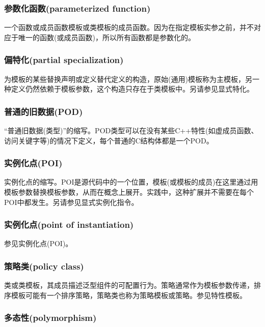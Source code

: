 \subsubsection{参数化函数(parameterized function)}

一个函数或成员函数模板或类模板的成员函数。因为在指定模板实参之前，并不对应于唯一的函数(或成员函数)，所以所有函数都是参数化的。

\subsubsection{偏特化(partial specialization)}

为模板的某些替换声明或定义替代定义的构造，原始(通用)模板称为主模板，另一种定义仍然依赖于模板参数，这个构造只存在于类模板中。另请参见显式特化。

\subsubsection{普通的旧数据(POD)}

“普通旧数据(类型)”的缩写。POD类型可以在没有某些C++特性(如虚成员函数、访问关键字等)的情况下定义，每个普通的C结构体都是一个POD。

\subsubsection{实例化点(POI)}

实例化点的缩写。POI是源代码中的一个位置，模板(或模板的成员)在这里通过用模板参数替换模板参数，从而在概念上展开。实践中，这种扩展并不需要在每个POI中都发生。另请参见显式实例化指令。

\subsubsection{实例化点(point of instantiation)}

参见实例化点(POI)。

\subsubsection{策略类(policy class)}

类或类模板，其成员描述泛型组件的可配置行为。策略通常作为模板参数传递，排序模板可能有一个排序策略，策略类也称为策略模板或策略。参见特性模板。

\subsubsection{多态性(polymorphism)}

